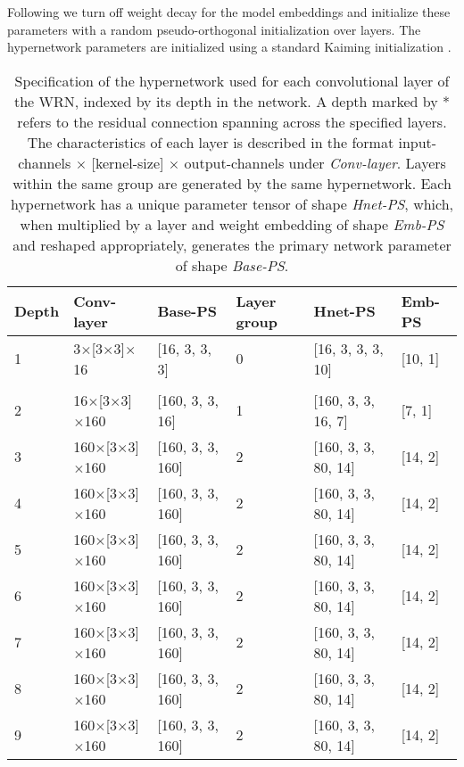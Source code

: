 \documentclass{article} \usepackage{iclr2021_conference,times}
\begin{document}
Following \citet{savarese_learning_2019} we turn off weight decay for the model embeddings and initialize these parameters with a random pseudo-orthogonal initialization over layers. The hypernetwork parameters are initialized using a standard Kaiming initialization \citep{he_delving_2015}.

\begin{table}[htbp!]
  \caption{Specification of the hypernetwork used for each convolutional layer of the WRN, indexed by its depth in the network. A depth marked by * refers to the residual connection spanning across the specified layers. The characteristics of each layer is described in the format input-channels $\times$ [kernel-size] $\times$ output-channels under \emph{Conv-layer}. Layers within the same group are generated by the same hypernetwork. Each hypernetwork has a unique parameter tensor of shape \emph{Hnet-PS}, which, when multiplied by a layer and weight embedding of shape \emph{Emb-PS} and reshaped appropriately, generates the primary network parameter of shape \emph{Base-PS}.}
  \label{tab:hnet-spec}
 \centering
  {\renewcommand{\arraystretch}{1.1}\setlength{\tabcolsep}{5pt}
  \begin{tabular}{@{}llllll@{}}
  \toprule
Depth & Conv-layer & Base-PS & Layer group & Hnet-PS & Emb-PS \\ 
 \midrule
1 & 3$\times$[3$\times$3]$\times$16 & [16, 3, 3, 3] & 0 & [16, 3, 3, 3, 10] & [10, 1] \\ 
 &  &  &  &  &  \\ 
2 & 16$\times$[3$\times$3]$\times$160 & [160, 3, 3, 16] & 1 & [160, 3, 3, 16, 7] & [7, 1] \\ 
3 & 160$\times$[3$\times$3]$\times$160 & [160, 3, 3, 160] & 2 & [160, 3, 3, 80, 14] & [14, 2] \\ 
4 & 160$\times$[3$\times$3]$\times$160 & [160, 3, 3, 160] & 2 & [160, 3, 3, 80, 14] & [14, 2] \\ 
5 & 160$\times$[3$\times$3]$\times$160 & [160, 3, 3, 160] & 2 & [160, 3, 3, 80, 14] & [14, 2] \\ 
6 & 160$\times$[3$\times$3]$\times$160 & [160, 3, 3, 160] & 2 & [160, 3, 3, 80, 14] & [14, 2] \\ 
7 & 160$\times$[3$\times$3]$\times$160 & [160, 3, 3, 160] & 2 & [160, 3, 3, 80, 14] & [14, 2] \\ 
8 & 160$\times$[3$\times$3]$\times$160 & [160, 3, 3, 160] & 2 & [160, 3, 3, 80, 14] & [14, 2] \\ 
9 & 160$\times$[3$\times$3]$\times$160 & [160, 3, 3, 160] & 2 & [160, 3, 3, 80, 14] & [14, 2] \\ 

\end{tabular}}
\end{table}
\end{document}
